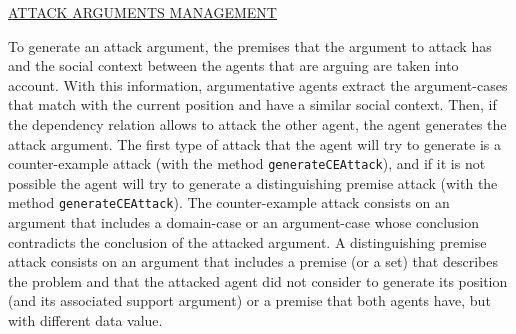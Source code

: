 \underline{ATTACK ARGUMENTS MANAGEMENT}

To generate an attack argument, the premises that the argument to attack has and the social context between the agents that are arguing are taken into account. With this information, argumentative agents extract the argument-cases that match with the current position and have a similar social context. Then, if the dependency relation allows to attack the other agent, the agent generates the attack argument. The first type of attack that the agent will try to generate is a counter-example attack (with the method \lstinline{generateCEAttack}), and if it is not possible the agent will try to generate a distinguishing premise attack (with the method \lstinline{generateCEAttack}). The counter-example attack consists on an argument that includes a domain-case or an argument-case whose conclusion contradicts the conclusion of the attacked argument. A distinguishing premise attack consists on an argument that includes a premise (or a set) that describes the problem and that the attacked agent did not consider to generate its position (and its associated support argument) or a premise that both agents have, but with different data value. %


